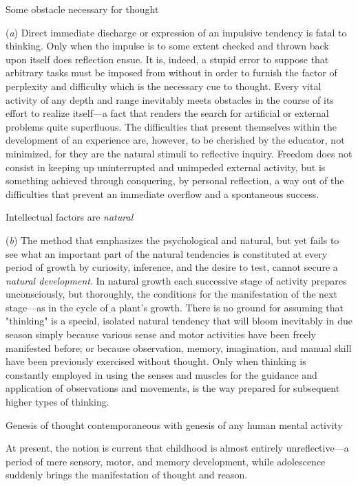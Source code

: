 \documentclass[letterpaper]{book}
\begin{document}
Some obstacle necessary for thought

(\emph{a}) Direct immediate discharge or expression of an impulsive
tendency is fatal to thinking. Only when the impulse is to some extent
checked and thrown back upon itself does reflection ensue. It is,
indeed, a stupid error to suppose that arbitrary tasks must be imposed
from without in order to furnish the factor of perplexity and difficulty
which is the necessary cue to thought. Every vital activity of any depth
and range inevitably meets obstacles in the course of its effort to
realize itself---a fact that renders the search for artificial or
external problems quite superfluous. The difficulties that present
themselves within the development of an experience are, however, to be
cherished by the educator, not minimized, for they are the natural
stimuli
to reflective inquiry. Freedom does not consist in keeping up
uninterrupted and unimpeded external activity, but is something achieved
through conquering, by personal reflection, a way out of the
difficulties that prevent an immediate overflow and a spontaneous
success.

Intellectual factors are \emph{natural}

(\emph{b}) The method that emphasizes the psychological and natural, but
yet fails to see what an important part of the natural tendencies is
constituted at every period of growth by curiosity, inference, and the
desire to test, cannot secure a \emph{natural development}. In natural
growth each successive stage of activity prepares unconsciously, but
thoroughly, the conditions for the manifestation of the next stage---as
in the cycle of a plant's growth. There is no ground for assuming that
"thinking" is a special, isolated natural tendency that will bloom
inevitably in due season simply because various sense and motor
activities have been freely manifested before; or because observation,
memory, imagination, and manual skill have been previously exercised
without thought. Only when thinking is constantly employed in using the
senses and muscles for the guidance and application of observations and
movements, is the way prepared for subsequent higher types of thinking.

Genesis of thought contemporaneous with genesis of any human mental
activity

At present, the notion is current that childhood is almost entirely
unreflective---a period of mere sensory, motor, and memory development,
while adolescence suddenly brings the manifestation of thought and
reason.
\end{document}
